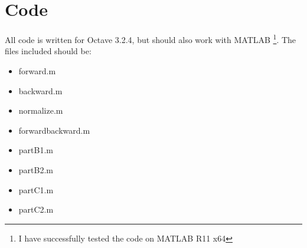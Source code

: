 \documentclass[english]{article}
\begin{document}
\section{Code}
All code is written for Octave 3.2.4, but should also work with MATLAB
\footnote{I have successfully tested the code on MATLAB R11 x64}. The files
included should be:
\begin{itemize}
  \item forward.m
  \item backward.m
  \item normalize.m
  \item forwardbackward.m
  \item partB1.m
  \item partB2.m
  \item partC1.m
  \item partC2.m
\end{itemize}
\end{document}

